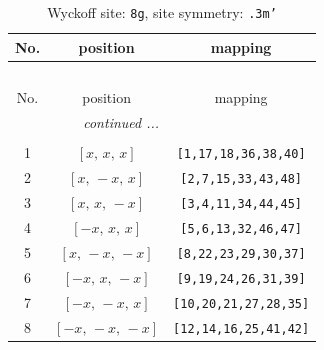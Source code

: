 \documentclass[fleqn,8pt]{jsarticle}
\begin{document}
\renewcommand{\arraystretch}{1.2}
\begin{longtable}{ccc}
\caption{Wyckoff site: {\tt 8g}, site symmetry: {\tt .3m'}}
 \\
 \hline \hline
No. & position & mapping \\ \hline \endfirsthead

\multicolumn{2}{l}{\tablename\ \thetable{}} \\
 \hline \hline
No. & position & mapping \\ \hline \endhead

 \hline \hline
\multicolumn{2}{r}{\footnotesize\it continued ...} \\ \endfoot

 \hline \hline
\multicolumn{2}{r}{} \\ \endlastfoot

1 & $\left[ x,\, x,\, x \right]$ & {\tt [1,17,18,36,38,40]} \\ \hline
2 & $\left[ x,\, - x,\, x \right]$ & {\tt [2,7,15,33,43,48]} \\ \hline
3 & $\left[ x,\, x,\, - x \right]$ & {\tt [3,4,11,34,44,45]} \\ \hline
4 & $\left[ - x,\, x,\, x \right]$ & {\tt [5,6,13,32,46,47]} \\ \hline
5 & $\left[ x,\, - x,\, - x \right]$ & {\tt [8,22,23,29,30,37]} \\ \hline
6 & $\left[ - x,\, x,\, - x \right]$ & {\tt [9,19,24,26,31,39]} \\ \hline
7 & $\left[ - x,\, - x,\, x \right]$ & {\tt [10,20,21,27,28,35]} \\ \hline
8 & $\left[ - x,\, - x,\, - x \right]$ & {\tt [12,14,16,25,41,42]} \\
\end{longtable}
\renewcommand{\arraystretch}{1.2}
\end{document}
